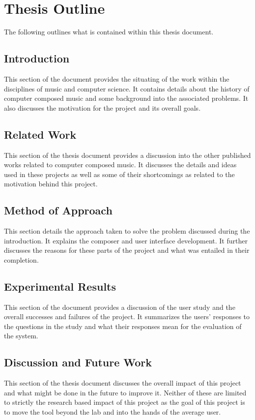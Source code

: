 \section{Thesis Outline}
\label{sec:thesisoutline}

The following outlines what is contained within this thesis document.

\subsection{Introduction}
\label{subsec:outlineintroduction}

This section of the document provides the situating of the work within the disciplines of music and computer science.  It contains details about the history of computer composed music and some background into the associated problems.  It also discusses the motivation for the project and its overall goals.

\subsection{Related Work}
\label{subsec:outlinerelatedwork}

This section of the thesis document provides a discussion into the other published works related to computer composed music.  It discusses the details and ideas used in these projects as well as some of their shortcomings as related to the motivation behind this project.

\subsection{Method of Approach}
\label{subsec:outlinemethodofapproach}

This section details the approach taken to solve the problem discussed during the introduction.  It explains the composer and user interface development.  It further discusses the reasons for these parts of the project and what was entailed in their completion.

\subsection{Experimental Results}
\label{subsec:outlineexperimentalresults}

This section of the document provides a discussion of the user study and the overall successes and failures of the project.  It summarizes the users' responses to the questions in the study and what their responses mean for the evaluation of the system.

\subsection{Discussion and Future Work}
\label{subsec:outlinediscusionandfuturework}

This section of the thesis document discusses the overall impact of this project and what might be done in the future to improve it.  Neither of these are limited to strictly the research based impact of this project as the goal of this project is to move the tool beyond the lab and into the hands of the average user.